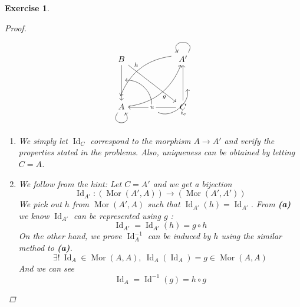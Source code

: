 \documentclass{article}
\theoremstyle{breakstyle}
\newtheorem{exercise}{Exercise}[section]
\DeclareMathOperator{\id}{Id}
\DeclareMathOperator{\mor}{Mor}
\begin{document}
\begin{exercise}
\begin{proof}
	$$
	\begin{tikzcd}
B \arrow[rrdd] \arrow[dd]                                                    &                                                                               & A' \arrow[lldd, "h"', bend right, shift right=3] \arrow[loop, distance=2em, in=125, out=55] \\
{}                                                                           &                                                                               & {}                                                                                          \\
A \arrow[rruu, "g"', bend right] \arrow[loop, distance=2em, in=305, out=235] & {} \arrow[ru, "i_c"', bend right=67, shift right=2] \arrow[lu, bend right=49] & C \arrow[uu] \arrow[ll, "u" description]                                                   
	\end{tikzcd}
	$$ 
	\begin{enumerate}
        \item We simply let $\id_{C}$ correspond to the morphism
            $A\longrightarrow A'$ and verify the properties stated in the
            problems. Also, uniqueness can be obtained by letting $C=A$.
		\item We follow from the hint: Let $C=A'$ and we get a bijection
			$$
			\id_{A'}:(\mor(A',A))\longrightarrow (\mor(A',A'))
			$$ 
            We pick out $h$ from $\mor{(A',A)}$ such that
            $\id_{A'}(h)=\id_{A'}$. From \textbf{(a)} we know $\id_{A'}$ can be
            represented using $g$ :
			$$
			\id_{A'}=\id_{A'}(h)=g\circ h
			$$ 
            On the other hand, we prove $\id_{A}^{-1}$ can be induced by $h$
            using the similar method to \textbf{(a)}.
			$$
            \exists !\ \id_{A}\in \mor{(A,A)},\ \id_{A}(\id_{A})=g\in \mor{(A,A)}
			$$ 
			And we can see
			$$
			\id_{A}=\id^{-1}(g)=h\circ g
			$$ 
	\end{enumerate}
\end{proof}

\end{exercise}
\end{document}
